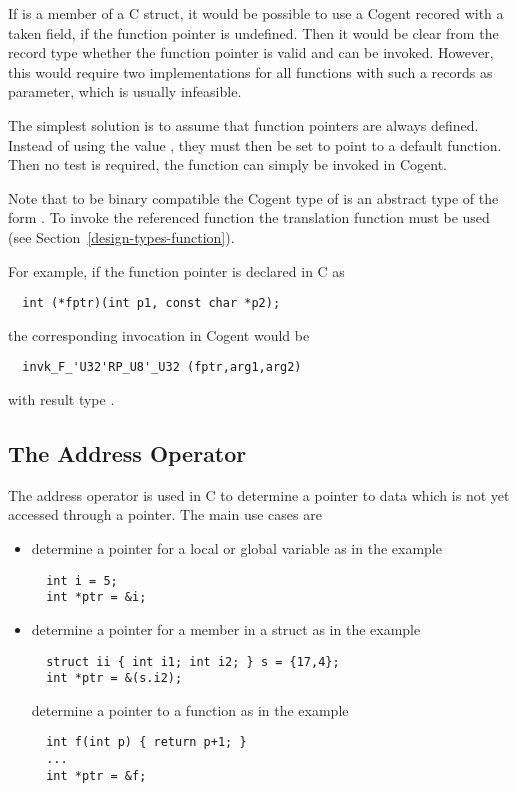 If  is a member of a C struct, it would be possible to use a Cogent recored with a taken field,
if the function pointer is undefined. Then it would be clear from the record type whether the function pointer
is valid and can be invoked. However, this would require two implementations for all functions with such a records 
as parameter, which is usually infeasible.

The simplest solution is to assume that function pointers are always defined. Instead of using the value 
, they must then be set to point to a default function. Then no test is required, the function
can simply be invoked in Cogent.

Note that to be binary compatible the Cogent type of  is an abstract type of the form .
To invoke the referenced function the translation function  must be used (see 
Section~\ref{design-types-function}). 

For example, if the function pointer is declared in C as 
\begin{verbatim}
  int (*fptr)(int p1, const char *p2);
\end{verbatim}
the corresponding invocation in Cogent would be
\begin{verbatim}
  invk_F_'U32'RP_U8'_U32 (fptr,arg1,arg2)
\end{verbatim}
with result type .

\subsection{The Address Operator \code{\&}}
\label{app-trans-addrop}

The address operator \code{\&} is used in C to determine a pointer to data which is not yet accessed through a 
pointer. The main use cases are
\begin{itemize}
\item determine a pointer for a local or global variable as in the example
\begin{verbatim}
  int i = 5;
  int *ptr = &i;
\end{verbatim}

\item determine a pointer for a member in a struct as in the example
\begin{verbatim}
  struct ii { int i1; int i2; } s = {17,4};
  int *ptr = &(s.i2);
\end{verbatim}

determine a pointer to a function as in the example
\begin{verbatim}
  int f(int p) { return p+1; }
  ...
  int *ptr = &f;
\end{verbatim}
\end{itemize}

